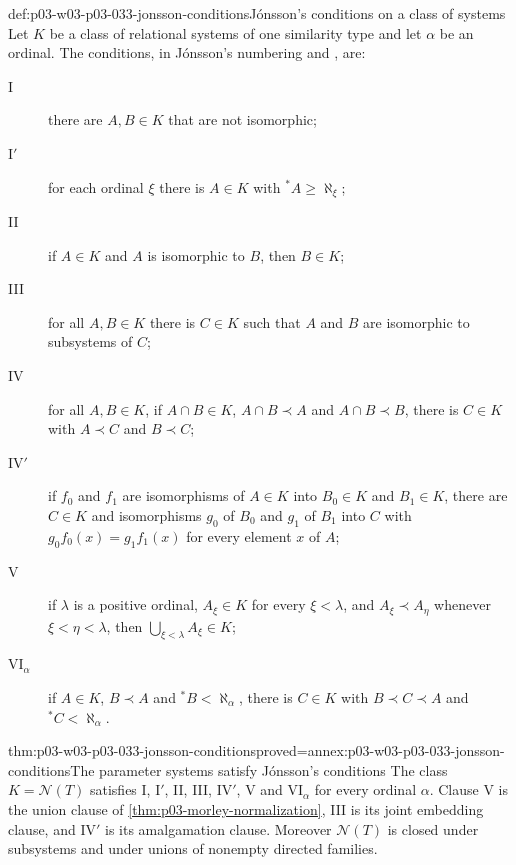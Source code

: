 \begin{hbdefinition}{def:p03-w03-p03-033-jonsson-conditions}{Jónsson's conditions on a class of systems}
Let \(K\) be a class of relational systems of one similarity type and let
\(\alpha\) be an ordinal. The conditions, in Jónsson's numbering
\cite[p.~195]{Jonsson1956} and \cite[pp.~137--138]{Jonsson1960}, are:
\begin{description}
\item[I] there are \(A,B\in K\) that are not isomorphic;
\item[I\('\)] for each ordinal \(\xi\) there is \(A\in K\) with \(^*A\geq\aleph_\xi\);
\item[II] if \(A\in K\) and \(A\) is isomorphic to \(B\), then \(B\in K\);
\item[III] for all \(A,B\in K\) there is \(C\in K\) such that \(A\) and
\(B\) are isomorphic to subsystems of \(C\);
\item[IV] for all \(A,B\in K\), if \(A\cap B\in K\), \(A\cap B\prec A\)
and \(A\cap B\prec B\), there is \(C\in K\) with \(A\prec C\) and
\(B\prec C\);
\item[IV\('\)] if \(f_0\) and \(f_1\) are isomorphisms of \(A\in K\)
into \(B_0\in K\) and \(B_1\in K\), there are \(C\in K\) and
isomorphisms \(g_0\) of \(B_0\) and \(g_1\) of \(B_1\) into \(C\) with
\(g_0f_0(x)=g_1f_1(x)\) for every element \(x\) of \(A\);
\item[V] if \(\lambda\) is a positive ordinal, \(A_\xi\in K\) for every
\(\xi<\lambda\), and \(A_\xi\prec A_\eta\) whenever \(\xi<\eta<\lambda\),
then \(\bigcup_{\xi<\lambda}A_\xi\in K\);
\item[VI\(_\alpha\)] if \(A\in K\), \(B\prec A\) and \(^*B<\aleph_\alpha\),
there is \(C\in K\) with \(B\prec C\prec A\) and \(^*C<\aleph_\alpha\).
\end{description}
\end{hbdefinition}

\begin{hbtheorem}{thm:p03-w03-p03-033-jonsson-conditions}{proved=annex:p03-w03-p03-033-jonsson-conditions}{The parameter systems satisfy Jónsson's conditions}
The class \(K=\mathcal N(T)\) satisfies I, I\('\), II, III, IV\('\), V and
VI\(_\alpha\) for every ordinal \(\alpha\). Clause V is the union clause
of \cref{thm:p03-morley-normalization}, III is its joint embedding clause,
and IV\('\) is its amalgamation clause. Moreover \(\mathcal N(T)\) is
closed under subsystems and under unions of nonempty directed families.
\end{hbtheorem}

